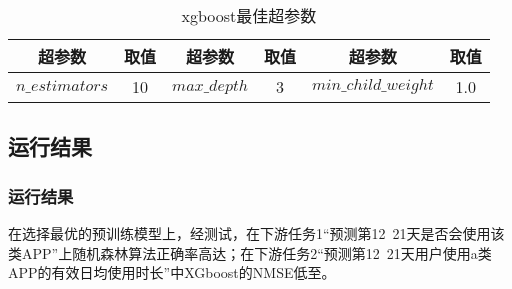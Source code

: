 \documentclass[withoutpreface,bwprint]{cumcmthesis}
\begin{document}
\begin{table}[!htbp]
    \caption{xgboost最佳超参数}\label{tab:011} \centering
    \begin{tabular}{cccccc}
        \toprule[1.5pt]
        超参数             & 取值 & 超参数          & 取值 & 超参数                  & 取值  \\
        \midrule[1pt]
        $n\_estimators$ & 10 & $max\_depth$ & 3  & $min\_child\_weight$ & 1.0 \\
        \bottomrule[1.5pt]
    \end{tabular}
\end{table}

\subsection{运行结果}

\subsubsection{运行结果}

在选择最优的预训练模型上，经测试，在下游任务1“预测第12~21天是否会使用该类APP”上随机森林算法正确率高达；在下游任务2“预测第12~21天用户使用a类APP的有效日均使用时长”中XGboost的NMSE低至。
\end{document}
